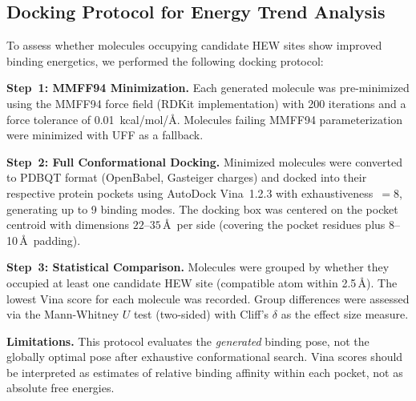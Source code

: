 \subsection{Docking Protocol for Energy Trend Analysis}

To assess whether molecules occupying candidate HEW sites show improved
binding energetics, we performed the following docking protocol:

\textbf{Step~1: MMFF94 Minimization.}
Each generated molecule was pre-minimized using the MMFF94 force field
(RDKit implementation) with 200 iterations and a force tolerance of
0.01~kcal/mol/\AA. Molecules failing MMFF94 parameterization were
minimized with UFF as a fallback.

\textbf{Step~2: Full Conformational Docking.}
Minimized molecules were converted to PDBQT format (OpenBabel, Gasteiger
charges) and docked into their respective protein pockets using AutoDock
Vina~1.2.3 with exhaustiveness~$=8$, generating up to 9 binding modes.
The docking box was centered on the pocket centroid with dimensions
$22$--$35$\,\AA\ per side (covering the pocket residues plus 8--10\,\AA\
padding).

\textbf{Step~3: Statistical Comparison.}
Molecules were grouped by whether they occupied at least one candidate HEW
site (compatible atom within 2.5\,\AA). The lowest Vina score for each
molecule was recorded. Group differences were assessed via the
Mann-Whitney $U$ test (two-sided) with Cliff's $\delta$ as the
effect size measure.

\textbf{Limitations.}
This protocol evaluates the \textit{generated} binding pose, not the
globally optimal pose after exhaustive conformational search.
Vina scores should be interpreted as estimates of relative binding
affinity within each pocket, not as absolute free energies.

